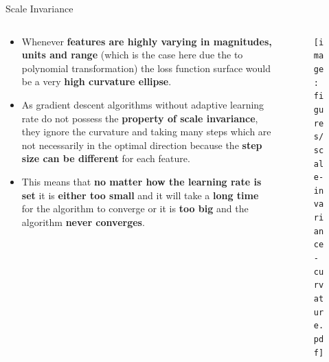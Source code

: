 \documentclass[main.tex]{subfiles}
\begin{document}
    \begin{frame}{Scale Invariance}
        \begin{columns}
            \begin{column}{0.6\textwidth}
                \begin{itemize}
                    \item Whenever \textbf{features are highly varying in magnitudes, units and range} (which is the case here due the to polynomial transformation) the loss function surface would be a very \textbf{high curvature ellipse}.
                    \item As gradient descent algorithms without adaptive learning rate do not possess the \textbf{property of scale invariance}, they ignore the curvature and taking many steps which are not necessarily in the optimal direction because the \textbf{step size can be different} for each feature.
                    \item This means that \textbf{no matter how the learning rate is set} it is \textbf{either too small} and it will take a \textbf{long time} for the algorithm to converge or it is \textbf{too big} and the algorithm \textbf{never converges}.
                \end{itemize}
            \end{column}
            \begin{column}{0.4\textwidth}
                \begin{figure}
                    \label{fig:scale-invariance-curvature}
                    \texttt{[image: figures/scale-invariance-curvature.pdf]}
                \end{figure}
            \end{column}
        \end{columns}
    \end{frame}
    
\end{document}
